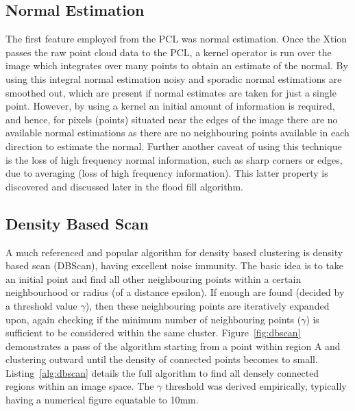 \documentclass[]{article}
\begin{document}
{\subsection{Normal Estimation} %
\label{sub:normal_estimation}

The first feature employed from the PCL was normal estimation. Once the Xtion passes the raw point cloud data to the PCL, a kernel operator is run over the image which integrates over many points to obtain an estimate of the normal. By using this integral normal estimation noisy and sporadic normal estimations are smoothed out, which are present if normal estimates are taken for just a single point. However, by using a kernel an initial amount of information is required, and hence, for pixels (points) situated near the edges of the image there are no available normal estimations as there are no neighbouring points available in each direction to estimate the normal. Further another caveat of using this technique is the loss of high frequency normal information, such as sharp corners or edges, due to averaging (loss of high frequency information). This latter property is discovered and discussed later in the flood fill algorithm. 
\subsection{Density Based Scan} %
\label{sub:density_based_scan}


A much referenced and popular algorithm for density based clustering is density based scan (DBScan), having excellent noise immunity. The basic idea is to take an initial point and find all other neighbouring points within a certain neighbourhood or radius (of a distance epsilon). If enough are found (decided by a threshold value $\gamma$), then these neighbouring points are iteratively expanded upon, again checking if the minimum number of neighbouring points ($\gamma$) is sufficient to be considered within the same cluster. Figure~\ref{fig:dbscan} demonstrates a pass of the algorithm starting from a point within region A and clustering outward until the density of connected points becomes to small. Listing~\ref{alg:dbscan} details the full algorithm to find all densely connected regions within an image space. The $\gamma$ threshold was derived empirically, typically having a numerical figure equatable to 10mm.  




}
\end{document}
